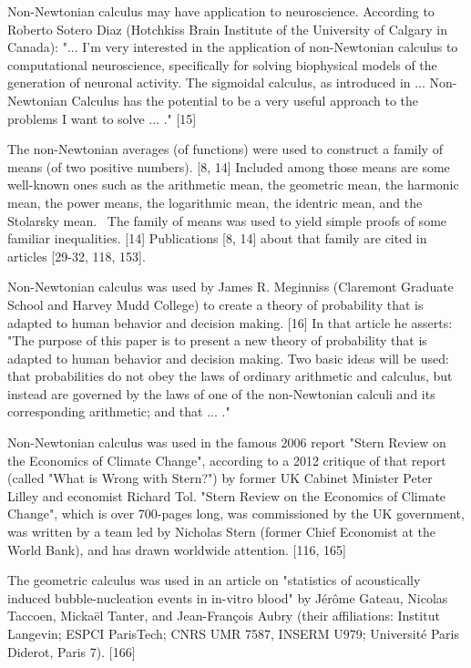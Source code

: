 \documentclass[12pt]{article}
\begin{document}
Non-Newtonian calculus may have application to neuroscience. According to Roberto Sotero Diaz (Hotchkiss Brain Institute of the University of Calgary in Canada): "... I’m very interested in the application of non-Newtonian calculus to computational neuroscience, specifically for solving biophysical models of the generation of neuronal activity. The sigmoidal calculus, as introduced in ... Non-Newtonian Calculus has the potential to be a very useful approach to the problems I want to solve ... ." [15]

The non-Newtonian averages (of functions) were used to construct a family of means (of two positive numbers). [8, 14] Included among those means are some well-known ones such as the arithmetic mean, the geometric mean, the harmonic mean, the power means, the logarithmic mean, the identric mean, and the Stolarsky mean.  The family of means was used to yield simple proofs of some familiar inequalities. [14] Publications [8, 14] about that family are cited in articles [29-32, 118, 153].

Non-Newtonian calculus was used by James R. Meginniss (Claremont Graduate School and Harvey Mudd College) to create a theory of probability that is adapted to human behavior and decision making. [16] In that article he asserts: "The purpose of this paper is to present a new theory of probability that is adapted to human behavior and decision making. Two basic ideas will be used: that probabilities do not obey the laws of ordinary arithmetic and calculus, but instead are governed by the laws of one of the non-Newtonian calculi and its corresponding arithmetic; and that ... ."

Non-Newtonian calculus was used in the famous 2006 report "Stern Review on the Economics of Climate Change", according to a 2012 critique of that report (called "What is Wrong with Stern?") by former UK Cabinet Minister Peter Lilley and economist Richard Tol. "Stern Review on the Economics of Climate Change", which is over 700-pages long, was commissioned by the UK government, was written by a team led by Nicholas Stern (former Chief Economist at the World Bank), and has drawn worldwide attention. [116, 165]

The geometric calculus was used in an article on "statistics of acoustically induced bubble-nucleation events in in-vitro blood" by Jérôme Gateau, Nicolas Taccoen, Mickaël Tanter, and Jean-François Aubry (their affiliations: Institut Langevin; ESPCI ParisTech; CNRS UMR 7587, INSERM U979; Université Paris Diderot, Paris 7). [166]
\end{document}
